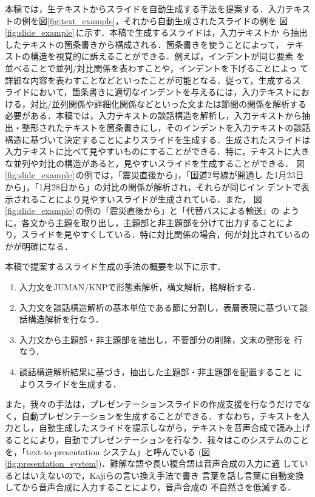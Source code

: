 本稿では，生テキストからスライドを自動生成する手法を提案する．入力テキス
トの例を図\ref{fig:text_example}，それから自動生成されたスライドの例を
図\ref{fig:slide_example}\,に示す．本稿で生成するスライドは，入力テキストか
ら抽出したテキストの箇条書きから構成される．箇条書きを使うことによって，
テキストの構造を視覚的に訴えることができる．例えば，インデントが同じ要素
を並べることで並列/対比関係を表わすことや，インデントを下げることによっ
て詳細な内容を表わすことなどといったことが可能となる．従って，生成するス
ライドにおいて，箇条書きに適切なインデントを与えるには，入力テキストにお
ける，対比/並列関係や詳細化関係などといった文または節間の関係を解析する
必要がある．本稿では，入力テキストの談話構造を解析し，入力テキストから抽
出・整形されたテキストを箇条書きにし，そのインデントを入力テキストの談話
構造に基づいて決定することによりスライドを生成する．生成されたスライドは
入力テキストに比べて見やすいものにすることができる．特に，テキストに大き
な並列や対比の構造があると，見やすいスライドを生成することができる．
図\ref{fig:slide_example}\,の例では，「震災直後から」，「国道2号線が開通し
た1月23日から」，「1月28日から」の対比の関係が解析され，それらが同じイン
デントで表示されることにより見やすいスライドが生成されている．また，
図\ref{fig:slide_example}\,の例の「震災直後から」と「代替バスによる輸送」の
ように，各文から主題を取り出し，主題部と非主題部を分けて出力することによ
り，スライドを見やすくしている．特に対比関係の場合，何が対比されているの
かが明確になる．

本稿で提案するスライド生成の手法の概要を以下に示す．

\begin{enumerate}
 \item 入力文をJUMAN/KNPで形態素解析，構文解析，格解析する．

 \item 入力文を談話構造解析の基本単位である節に分割し，表層表現に基づいて談
       話構造解析を行なう．

 \item 入力文から主題部・非主題部を抽出し，不要部分の削除，文末の整形を
       行なう．

 \item 談話構造解析結果に基づき，抽出した主題部・非主題部を配置すること
       によりスライドを生成する．
\end{enumerate}


また，我々の手法は，プレゼンテーションスライドの作成支援を行なうだけでな
く，自動プレゼンテーションを生成することができる．すなわち，テキストを入
力とし，自動生成したスライドを提示しながら，テキストを音声合成で読み上げ
ることにより，自動でプレゼンテーションを行なう．我々はこのシステムのこと
を，「text-to-presentation システム」と呼んでいる
(図\ref{fig:presentation_system})．難解な語や長い複合語は音声合成の入力に適
しているとはいえないので，Kajiらの言い換え手法\cite{Kaji02,Kaji04}で書き
言葉を話し言葉に自動変換してから音声合成に入力することにより，音声合成の
不自然さを低減する．

